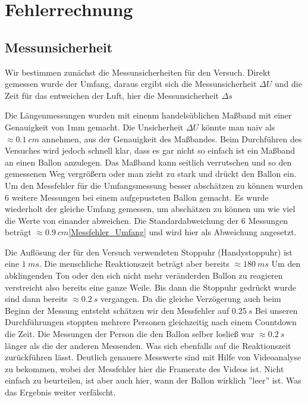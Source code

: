 \documentclass{article}
\begin{document}
    \section{Fehlerrechnung}
        \subsection{Messunsicherheit}
            Wir bestimmen zunächst die Messunsicherheiten für den Versuch.
            Direkt gemessen wurde der Umfang, daraus ergibt sich die Messunsicherheit \(\Delta U\)
            und die Zeit für das entweichen der Luft, hier die Messunsicherheit \(\Delta s\)

            Die Längenmessungen wurden mit einenm handelsüblichen Maßband mit einer Genauigkeit von 1mm gemacht.
            Die Unsicherheit \( \Delta U \) könnte man naiv als \( \approx \SI{0.1}{cm} \) annehmen, aus der Genauigkeit des Maßbandes.
            Beim Durchführen des Versuches wird jedoch schnell klar, dass es gar nicht so einfach ist ein Maßband an einen Ballon anzulegen.
            Das Maßband kann seitlich verrutschen und so den gemessenen Weg vergrößern oder man zieht zu stark und drückt den Ballon ein.
            Um den Messfehler für die Umfangsmessung besser abschätzen zu können wurden
            6 weitere Messungen bei einem aufgepusteten Ballon gemacht.
            Es wurde wiederholt der gleiche Umfang gemessen, um abschätzen zu können um wie viel die Werte von einander abweichen.
            Die Standardabweichung der 6 Messungen beträgt \( \approx \SI{0.9}{cm}\)\ref{Messfehler_Umfang} und wird hier als Abweichung angesetzt.
            
            Die Auflösung der für den Versuch verwendeten Stoppuhr (Handystoppuhr) ist eine \(\SI{1}{ms}\).
            Die menschliche Reaktionszeit beträgt aber bereits \(\approx \SI{180}{ms} \)\cite{Reaktionszeit}
            Um den abklingenden Ton oder den sich nicht mehr veränderden Ballon zu reagieren verstreicht also bereits eine ganze Weile.
            Bis dann die Stoppuhr gedrückt wurde sind dann bereits \(\approx \SI{0.2}{s}\) vergangen.
            Da die gleiche Verzögerung auch beim Beginn der Messung entsteht schätzen wir den Messfehler auf \(\SI{0.25}{s}\)
            Bei unseren Durchführungen stoppten mehrere Personen gleichzeitig nach einem Countdown die Zeit. Die Messungen der
            Person die den Ballon selber losließ war \(\approx \SI{0.2}{s} \) länger als die der anderen Messenden.
            Was sich ebenfalls auf die Reaktionszeit zurückführen lässt.
            Deutlich genauere Messwerte sind mit Hilfe von Videoanalyse zu bekommen, wobei der Messfehler hier die Framerate des Videos ist.
            Nicht einfach zu beurteilen, ist aber auch hier, wann der Ballon wirklich ''leer'' ist. Was das Ergebnis weiter verfälscht.
\end{document}

